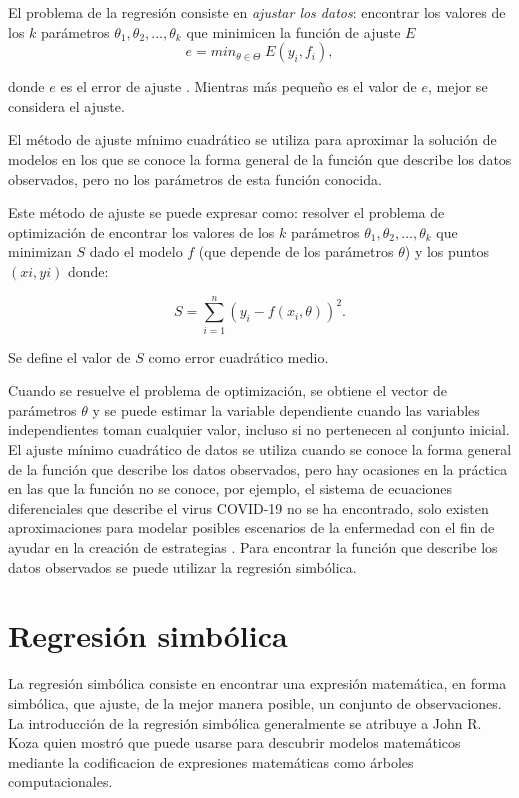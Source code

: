 El problema de la regresión consiste en \textit{ajustar los datos}: encontrar los valores de los $k$ parámetros $\theta_1, \theta_2, \dots, \theta_k$ que minimicen la función de ajuste $E$
\begin{equation*}
    e = min_{\theta \in \Theta} \; E(y_i, f_i),
\end{equation*}

donde $e$ es el error de ajuste \cite{statisticintroductions}. Mientras más pequeño es el valor de $e$, mejor se considera el ajuste.

El método de ajuste mínimo cuadrático se utiliza para aproximar la solución de modelos en los que se conoce la forma general de la función que describe los datos observados, pero no los parámetros de esta función conocida.

Este método de ajuste se puede expresar como: resolver el problema de optimización de encontrar los valores de los $k$ parámetros $\theta_1, \theta_2, \dots, \theta_k$ que minimizan $S$ dado el modelo $f$ (que depende de los parámetros $\theta$) y los puntos $(xi, yi)$ donde:

$$S = \sum_{i=1}^{n}(y_i - f(x_i, \theta))^2.$$

Se define el valor de $S$ como error cuadrático medio.

Cuando se resuelve el problema de optimización, se obtiene el vector de parámetros $\theta$ y se puede estimar la variable dependiente cuando las variables independientes toman cualquier valor, incluso si no pertenecen al conjunto inicial. El ajuste mínimo cuadrático de datos se utiliza cuando se conoce la forma general de la función que describe los datos observados, pero hay ocasiones en la práctica en las que la función no se conoce, por ejemplo, el sistema de ecuaciones diferenciales que describe el virus COVID-19 no se ha encontrado, solo existen aproximaciones para modelar posibles escenarios de la enfermedad con el fin de ayudar en la creación de estrategias \cite{kuddus2021mathematical}. Para encontrar la función que describe los datos observados se puede utilizar la regresión simbólica.

\section{Regresión simbólica}\label{section:symbolic_regression}

La regresión simbólica consiste en encontrar una expresión matemática, en forma simbólica, que ajuste, de la mejor manera posible, un conjunto de observaciones. La introducción de la regresión simbólica generalmente se atribuye a John R. Koza \cite{zelinka2005analytic} quien mostró que puede usarse para descubrir modelos matemáticos mediante la codificacion de expresiones matemáticas como árboles computacionales.


